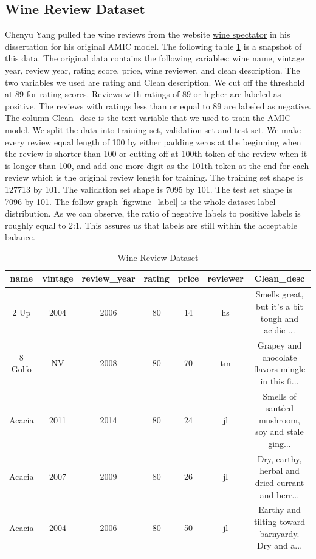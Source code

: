\documentclass{article}
\begin{document}
\subsection{Wine Review Dataset}
Chenyu Yang \cite{chenyu} pulled the wine reviews from the website \hyperlink{https://www.winespectator.com/ratings}{wine spectator} in his dissertation for his original AMIC model. The following table \ref{tab:wine} is a snapshot of this data. The original data contains the following variables: wine name, vintage year, review year, rating score, price, wine reviewer, and clean description. The two variables we used are rating and Clean description. We cut off the threshold at 89 for rating scores. Reviews with ratings of 89 or higher are labeled as positive. The reviews with ratings less than or equal to 89 are labeled as negative. The column Clean\_desc is the text variable that we used to train the AMIC model. We split the data into training set, validation set and test set. We make every review equal length of 100 by either padding zeros at the beginning when the review is shorter than 100 or cutting off at 100th token of the review when it is longer than 100, and add one more digit as the 101th token at the end for each review which is the original review length for training. The training set shape is 127713 by 101. The validation set shape is 7095 by 101. The test set shape is 7096 by 101. The follow graph \ref{fig:wine_label} is the  whole dataset label distribution. As we can observe, the ratio of negative labels to positive labels is roughly equal to 2:1. This assures us that labels are still within the acceptable balance.  
\begin{table}[!ht]
\begin{threeparttable}
    \small
    \centering
   \begin{tabular}{|c|c|c|c|c|c|c|}
\hline name & vintage & review\_year & rating & price & reviewer & Clean\_desc \\
\hline 2 Up & 2004 & 2006 & 80 & 14 & hs & Smells great, but it's a bit tough and acidic ... \\
\hline 8 Golfo & NV & 2008 & 80 & 70 & tm & Grapey and chocolate flavors mingle in this fi... \\
\hline Acacia & 2011 & 2014 & 80 & 24 & jl & Smells of sautéed mushroom, soy and stale ging... \\
\hline Acacia & 2007 & 2009 & 80 & 26 & jl & Dry, earthy, herbal and dried currant and berr... \\
\hline Acacia & 2004 & 2006 & 80 & 50 & jl & Earthy and tilting toward barnyardy. Dry and a... \\
\hline
\end{tabular}
    \caption{Wine Review Dataset}
    \label{tab:wine}
\end{threeparttable}
\end{table}
\end{document}
